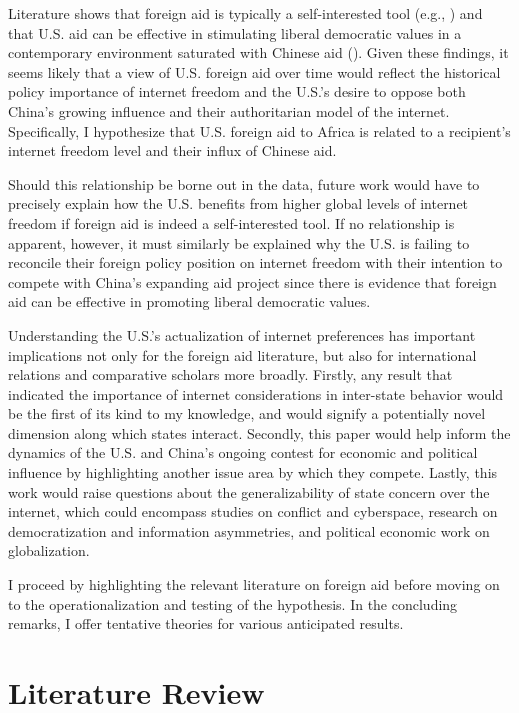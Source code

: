 Literature shows that foreign aid is typically a self-interested tool (e.g., \cite{hoeffler2011}) and that U.S. aid can be effective in stimulating liberal democratic values in a contemporary environment saturated with Chinese aid (\cite{blair2022}). Given these findings, it seems likely that a view of U.S. foreign aid over time would reflect the historical policy importance of internet freedom and the U.S.'s desire to oppose both China's growing influence and their authoritarian model of the internet. Specifically, I hypothesize that U.S. foreign aid to Africa is related to a recipient's internet freedom level and their influx of Chinese aid.

Should this relationship be borne out in the data, future work would have to precisely explain how the U.S. benefits from higher global levels of internet freedom if foreign aid is indeed a self-interested tool. If no relationship is apparent, however, it must similarly be explained why the U.S. is failing to reconcile their foreign policy position on internet freedom with their intention to compete with China's expanding aid project since there is evidence that foreign aid can be effective in promoting liberal democratic values.

Understanding the U.S.'s actualization of internet preferences has important implications not only for the foreign aid literature, but also for international relations and comparative scholars more broadly. Firstly, any result that indicated the importance of internet considerations in inter-state behavior would be the first of its kind to my knowledge, and would signify a potentially novel dimension along which states interact. Secondly, this paper would help inform the dynamics of the U.S. and China's ongoing contest for economic and political influence by highlighting another issue area by which they compete. Lastly, this work would raise questions about the generalizability of state concern over the internet, which could encompass studies on conflict and cyberspace, research on democratization and information asymmetries, and political economic work on globalization.

I proceed by highlighting the relevant literature on foreign aid before moving on to the operationalization and testing of the hypothesis. In the concluding remarks, I offer tentative theories for various anticipated results.  

\section*{Literature Review}
